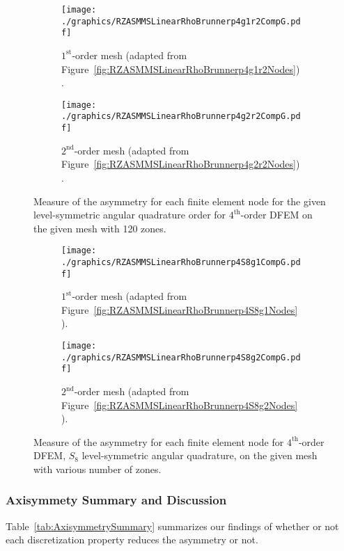 \documentclass[12pt]{article}
\begin{document}
\begin{figure}[!htb]
\centering
\begin{subfigure}{0.48\textwidth}
\centering
\texttt{[image: ./graphics/RZASMMSLinearRhoBrunnerp4g1r2CompG.pdf]}
\caption{$1^\text{st}$-order mesh (adapted from Figure~\ref{fig:RZASMMSLinearRhoBrunnerp4g1r2Nodes}).}
\end{subfigure}%
\hspace{0.04\textwidth}%
\begin{subfigure}{0.48\textwidth}
\centering
\texttt{[image: ./graphics/RZASMMSLinearRhoBrunnerp4g2r2CompG.pdf]}
\caption{$2^\text{nd}$-order mesh (adapted from Figure~\ref{fig:RZASMMSLinearRhoBrunnerp4g2r2Nodes}).}
\end{subfigure}
\caption{Measure of the asymmetry for each finite element node for the given level-symmetric angular quadrature order for $4^\text{th}$-order DFEM on the given mesh with 120 zones.}
\end{figure}

\begin{figure}[!htb]
\centering
\begin{subfigure}{0.48\textwidth}
\centering
\texttt{[image: ./graphics/RZASMMSLinearRhoBrunnerp4S8g1CompG.pdf]}
\caption{$1^\text{st}$-order mesh (adapted from Figure~\ref{fig:RZASMMSLinearRhoBrunnerp4S8g1Nodes}).}
\end{subfigure}%
\hspace{0.04\textwidth}%
\begin{subfigure}{0.48\textwidth}
\centering
\texttt{[image: ./graphics/RZASMMSLinearRhoBrunnerp4S8g2CompG.pdf]}
\caption{$2^\text{nd}$-order mesh (adapted from Figure~\ref{fig:RZASMMSLinearRhoBrunnerp4S8g2Nodes}).}
\end{subfigure}
\caption{Measure of the asymmetry for each finite element node for $4^\text{th}$-order DFEM, $S_8$ level-symmetric angular quadrature, on the given mesh with various number of zones.}
\end{figure}

\FloatBarrier

\subsubsection{Axisymmety Summary and Discussion}
Table~\ref{tab:AxisymmetrySummary} summarizes our findings of whether or not each discretization property reduces the asymmetry or not.
\end{document}
